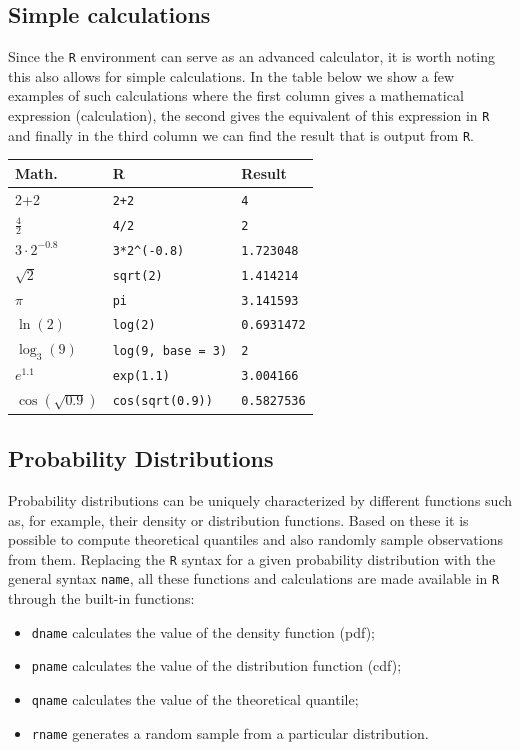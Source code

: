 \documentclass[12pt,]{krantz}
\providecommand{\tightlist}{%
  \setlength{\itemsep}{0pt}\setlength{\parskip}{0pt}}
\begin{document}
\subsection{Simple calculations}\label{simple-calculations}

Since the \texttt{R} environment can serve as an advanced calculator, it
is worth noting this also allows for simple calculations. In the table
below we show a few examples of such calculations where the first column
gives a mathematical expression (calculation), the second gives the
equivalent of this expression in \texttt{R} and finally in the third
column we can find the result that is output from \texttt{R}.

\begin{longtable}[]{@{}lll@{}}
\toprule
Math. & R & Result\tabularnewline
\midrule
\endhead
2+2 & \texttt{2+2} & \texttt{4}\tabularnewline
\(\frac{4}{2}\) & \texttt{4/2} & \texttt{2}\tabularnewline
\(3 \cdot 2^{-0.8}\) & \texttt{3*2\^{}(-0.8)} &
\texttt{1.723048}\tabularnewline
\(\sqrt{2}\) & \texttt{sqrt(2)} & \texttt{1.414214}\tabularnewline
\(\pi\) & \texttt{pi} & \texttt{3.141593}\tabularnewline
\(\ln(2)\) & \texttt{log(2)} & \texttt{0.6931472}\tabularnewline
\(\log_{3}(9)\) & \texttt{log(9,\ base\ =\ 3)} &
\texttt{2}\tabularnewline
\(e^{1.1}\) & \texttt{exp(1.1)} & \texttt{3.004166}\tabularnewline
\(\cos(\sqrt{0.9})\) & \texttt{cos(sqrt(0.9))} &
\texttt{0.5827536}\tabularnewline
\bottomrule
\end{longtable}

\subsection{Probability Distributions}\label{probability-distributions}

Probability distributions can be uniquely characterized by different
functions such as, for example, their density or distribution functions.
Based on these it is possible to compute theoretical quantiles and also
randomly sample observations from them. Replacing the \texttt{R} syntax
for a given probability distribution with the general syntax
\texttt{name}, all these functions and calculations are made available
in \texttt{R} through the built-in functions:

\begin{itemize}
\tightlist
\item
  \texttt{dname} calculates the value of the density function (pdf);
\item
  \texttt{pname} calculates the value of the distribution function
  (cdf);
\item
  \texttt{qname} calculates the value of the theoretical quantile;
\item
  \texttt{rname} generates a random sample from a particular
  distribution.
\end{itemize}
\end{document}
